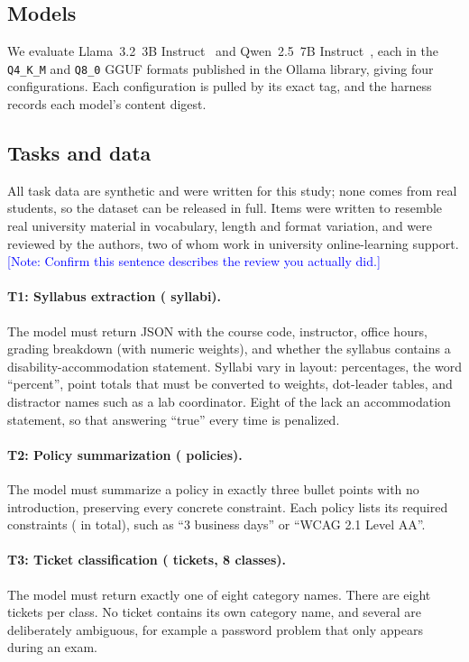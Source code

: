 \documentclass[sigconf,nonacm]{acmart}
\newcommand{\todonote}[1]{\textcolor{blue}{\textsf{[Note: #1]}}}
\newcommand{\todonote}[1]{\errmessage{Author note left in final build: #1}}
\begin{document}
\subsection{Models}
We evaluate Llama~3.2~3B Instruct~\cite{llama3} and Qwen~2.5~7B Instruct~\cite{qwen25}, each in the \texttt{Q4\_K\_M} and \texttt{Q8\_0} GGUF formats published in the Ollama library, giving four configurations.
Each configuration is pulled by its exact tag, and the harness records each model's content digest.

\subsection{Tasks and data}
All task data are synthetic and were written for this study; none comes from real students, so the dataset can be released in full.
Items were written to resemble real university material in vocabulary, length and format variation, and were reviewed by the authors, two of whom work in university online-learning support.
\todonote{Confirm this sentence describes the review you actually did.}

\paragraph{T1: Syllabus extraction (\NSyllabi{} syllabi).}
The model must return JSON with the course code, instructor, office hours, grading breakdown (with numeric weights), and whether the syllabus contains a disability-accommodation statement.
Syllabi vary in layout: percentages, the word ``percent'', point totals that must be converted to weights, dot-leader tables, and distractor names such as a lab coordinator.
Eight of the \NSyllabi{} lack an accommodation statement, so that answering ``true'' every time is penalized.

\paragraph{T2: Policy summarization (\NPolicies{} policies).}
The model must summarize a policy in exactly three bullet points with no introduction, preserving every concrete constraint.
Each policy lists its required constraints (\NConstraints{} in total), such as ``3 business days'' or ``WCAG 2.1 Level AA''.

\paragraph{T3: Ticket classification (\NTickets{} tickets, 8 classes).}
The model must return exactly one of eight category names.
There are eight tickets per class.
No ticket contains its own category name, and several are deliberately ambiguous, for example a password problem that only appears during an exam.
\end{document}
